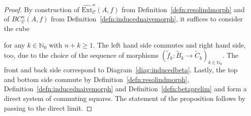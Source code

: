 \documentclass[12pt,a4paper]{article}
\numberwithin{equation}{section}
\theoremstyle{nonumberplain}
\newtheorem{proof}{Proof}
\begin{document}
\begin{proof}
By construction of $\widehat{\mathrm{Ext}}_{\mathcal{C}}^n(A, f)$ from Definition~\ref{defn:resolindmorph} and of $BC_{\mathcal{C}}^n(A, f)$ from Definition~\ref{defn:inducednaivemorph}, it suffices to consider the cube
\begin{center}
\end{center}
for any $k \in \mathbb{N}_0$ with $n+k \geq 1$. The left hand side commutes and right hand side, too, due to the choice of the sequence of morphisms $(\widetilde{f}_k: \widetilde{B}_k \rightarrow \widetilde{C}_k)_{k \in \mathbb{N}_0}$. The front and back side correspond to Diagram~\ref{diag:inducedbeta}. Lastly, the top and bottom side commute by Definition~\ref{defn:resolindmorph}, Definition~\ref{defn:inducednaivemorph} and Definition~\ref{defn:betaprelim} and form a direct system of commuting squares. The statement of the proposition follows by passing to the direct limit.
\end{proof}
\end{document}
